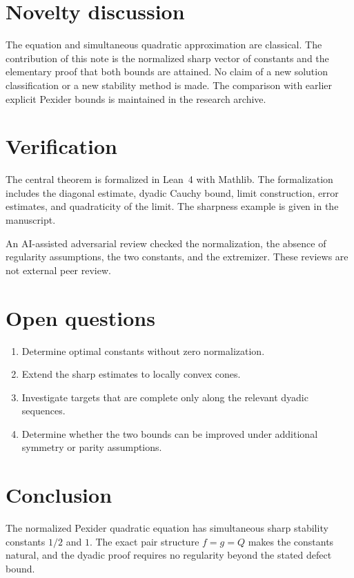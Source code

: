 \documentclass[11pt]{article}
\theoremstyle{definition}
\theoremstyle{remark}
\begin{document}
\section{Novelty discussion}

The equation and simultaneous quadratic approximation are classical. The contribution of this note is the normalized sharp vector of constants and the elementary proof that both bounds are attained. No claim of a new solution classification or a new stability method is made. The comparison with earlier explicit Pexider bounds is maintained in the research archive.

\section{Verification}

The central theorem is formalized in Lean~4 with Mathlib. The formalization includes the diagonal estimate, dyadic Cauchy bound, limit construction, error estimates, and quadraticity of the limit. The sharpness example is given in the manuscript.

An AI-assisted adversarial review checked the normalization, the absence of regularity assumptions, the two constants, and the extremizer. These reviews are not external peer review.

\section{Open questions}

\begin{enumerate}[label=(\arabic*)]
\item Determine optimal constants without zero normalization.
\item Extend the sharp estimates to locally convex cones.
\item Investigate targets that are complete only along the relevant dyadic sequences.
\item Determine whether the two bounds can be improved under additional symmetry or parity assumptions.
\end{enumerate}

\section{Conclusion}

The normalized Pexider quadratic equation has simultaneous sharp stability constants $1/2$ and $1$. The exact pair structure $f=g=Q$ makes the constants natural, and the dyadic proof requires no regularity beyond the stated defect bound.



\end{document}
